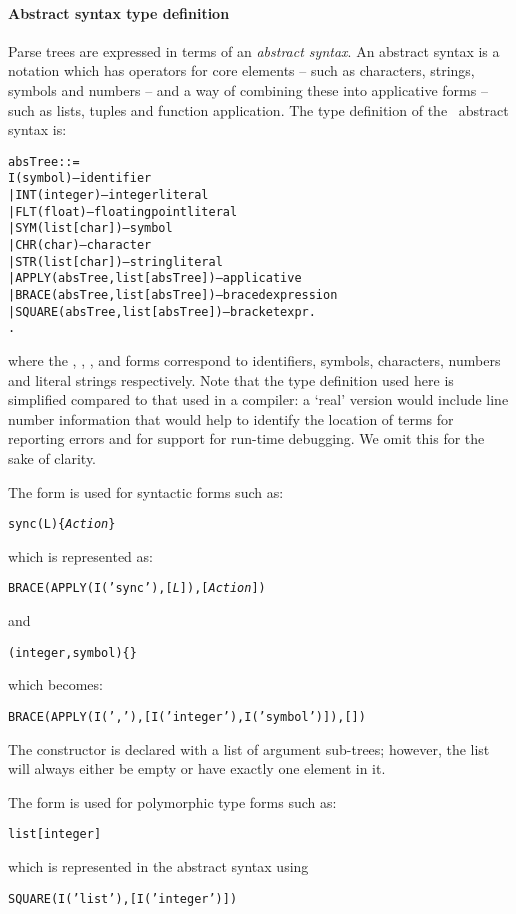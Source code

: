 \paragraph{ Abstract syntax type definition}
Parse trees are expressed in terms of an \emph{abstract syntax}. An abstract syntax is a notation which has operators for core elements -- such as characters, strings, symbols and numbers -- and a way of combining these into applicative forms -- such as lists, tuples and function application. The type definition of the \go\ abstract syntax is:
\begin{alltt}
absTree ::=
    I(symbol)                       -- identifier
  | INT(integer)                    -- integer literal
  | FLT(float)                      -- floating point literal
  | SYM(list[char])                 -- symbol
  | CHR(char)                       -- character
  | STR(list[char])                 -- string literal
  | APPLY(absTree,list[absTree])    -- applicative
  | BRACE(absTree,list[absTree])    -- braced expression
  | SQUARE(absTree,list[absTree])   -- bracket expr.
  .
\end{alltt}
where the , , ,  and  forms correspond to identifiers, symbols, characters, numbers and literal strings respectively. Note that the type definition used here is simplified compared to that used in a compiler: a `real' version would include line number information that would help to identify the location of terms for reporting errors and for support for run-time debugging. We omit this for the sake of clarity.

The  form is used for syntactic forms such as:
\begin{alltt}
sync(L)\{ \emph{Action} \}
\end{alltt}
which is represented as:
\begin{alltt}
BRACE(APPLY(I('sync'),[\emph{L}]),[\emph{Action}])
\end{alltt}
and
\begin{alltt}
(integer,symbol)\{\}
\end{alltt}
which becomes:
\begin{alltt}
BRACE(APPLY(I(','),[I('integer'),I('symbol')]),[])
\end{alltt}

The  constructor is declared with a list of argument sub-trees; however, the list will always either be empty or have exactly one element in it.

The  form is used for polymorphic type forms such as:
\begin{alltt}
list[integer]
\end{alltt}
which is represented in the abstract syntax using
\begin{alltt}
SQUARE(I('list'),[I('integer')])
\end{alltt}

